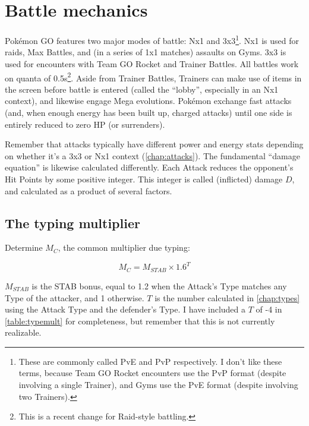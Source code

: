 \chapter{Battle mechanics}
\label{chap:battle}
Pokémon GO features two major modes of battle: Nx1 and 3x3\footnote{These are commonly called PvE and PvP
 respectively. I don't like these terms, because Team GO Rocket encounters use the PvP format (despite involving
 a single Trainer), and Gyms use the PvE format (despite involving two Trainers).}.
Nx1 is used for raids, Max Battles, and (in a series of 1x1 matches) assaults on Gyms.
3x3 is used for encounters with Team GO Rocket and Trainer Battles.
All battles work on quanta of 0.5s\footnote{This is a recent change for Raid-style battling.}.
Aside from Trainer Battles, Trainers can make use of items in the screen before
  battle is entered (called the ``lobby'', especially in an Nx1 context), and
  likewise engage Mega evolutions.
Pokémon exchange fast attacks (and, when enough energy has been built up, charged attacks)
  until one side is entirely reduced to zero HP (or surrenders).

Remember that attacks typically have different power and energy stats depending on
  whether it's a 3x3 or Nx1 context (\autoref{chap:attacks}).
The fundamental ``damage equation'' is likewise calculated differently.
Each Attack reduces the opponent's Hit Points by some positive integer.
This integer is called (inflicted) damage $D$, and calculated as a product of several factors.

\section{The typing multiplier}
\label{sec:typemult}
Determine $M_C$, the common multiplier due typing:

\[ M_C = M_{STAB} \times 1.6^{T} \]

$M_{STAB}$ is the STAB bonus, equal to 1.2 when the Attack's Type matches any
  Type of the attacker, and 1 otherwise.
$T$ is the number calculated in \autoref{chap:types} using the Attack Type
 and the defender's Type.
I have included a $T$ of -4 in \autoref{table:typemult} for completeness,
 but remember that this is not currently realizable.

